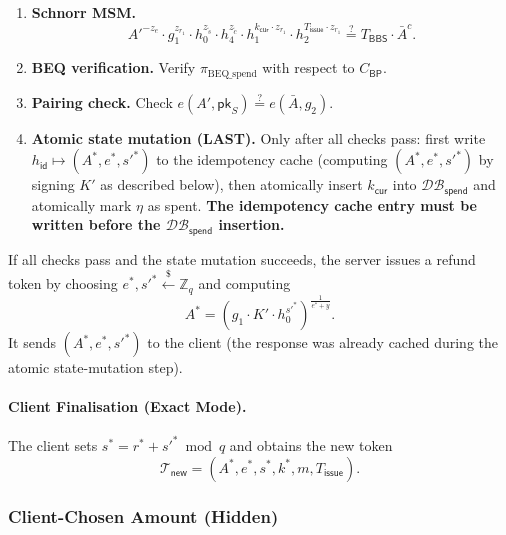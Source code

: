 \documentclass[11pt]{article}
\theoremstyle{definitionstyle}
\theoremstyle{plain}
\newcommand{\DB}{\mathcal{DB}}
\begin{document}
\begin{enumerate}[leftmargin=*]
\begin{align*}
    z_{\tilde{c}} \cdot h_4 + z_u \cdot h_1 + z_{r_1} \cdot T_{\mathsf{issue}} \cdot h_2 + z_v \cdot h_0 - T_{\mathsf{total}} &\stackrel{?}{=} z_{r_1} \cdot C_{\mathsf{total}} - T_{\mathsf{scale},T}, \\
    z_m \cdot h_4 + z_w \cdot h_0 - T_{\mathsf{BP}} &\stackrel{?}{=} z_{r_1} \cdot C_{\mathsf{BP}} - T_{\mathsf{scale},BP}.
  \end{align*}
\item \textbf{Schnorr MSM.}
  \[
  A'^{-z_e} \cdot g_1^{z_{r_1}} \cdot h_0^{z_{\tilde{s}}} \cdot h_4^{z_{\tilde{c}}} \cdot h_1^{k_{\mathsf{cur}} \cdot z_{r_1}} \cdot h_2^{T_{\mathsf{issue}} \cdot z_{r_1}} \stackrel{?}{=} T_{\mathsf{BBS}} \cdot \bar{A}^c.
  \]
\item \textbf{BEQ verification.} Verify $\pi_{\text{BEQ\_spend}}$ with respect to $C_{\mathsf{BP}}$.
\item \textbf{Pairing check.} Check $e(A', \mathsf{pk}_S) \stackrel{?}{=} e(\bar{A}, g_2)$.
\item \textbf{Atomic state mutation (LAST).} Only after all checks pass: first write $h_{\mathsf{id}} \mapsto (A^*, e^*, s'^*)$ to the idempotency cache (computing $(A^*, e^*, s'^*)$ by signing $K'$ as described below), then atomically insert $k_{\mathsf{cur}}$ into $\DB_{\mathsf{spend}}$ and atomically mark $\eta$ as spent. \textbf{The idempotency cache entry must be written before the $\DB_{\mathsf{spend}}$ insertion.}
\end{enumerate}

If all checks pass and the state mutation succeeds, the server issues a refund token by choosing $e^*, s'^* \xleftarrow{\$} \mathbb{Z}_q$ and computing
\[
A^* = \left( g_1 \cdot K' \cdot h_0^{s'^*} \right)^{\frac{1}{e^* + y}}.
\]
It sends $(A^*, e^*, s'^*)$ to the client (the response was already cached during the atomic state-mutation step).

\paragraph{Client Finalisation (Exact Mode).}
The client sets $s^* = r^* + s'^* \bmod q$ and obtains the new token
\[
\mathcal{T}_{\mathsf{new}} = (A^*, e^*, s^*, k^*, m, T_{\mathsf{issue}}).
\]

\subsubsection{Client-Chosen Amount (Hidden)}
\label{sec:spend-hidden}
\end{document}
